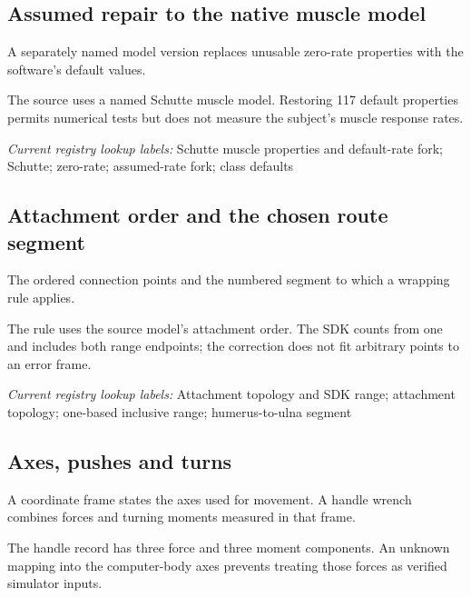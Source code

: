 \begin{samepage}
\subsection*{Assumed repair to the native muscle model}
\noindent A separately named model version replaces unusable zero-rate properties with the software’s default values.\par
\end{samepage}
\begin{samepage}
\noindent The source uses a named Schutte muscle model. Restoring 117 default properties permits numerical tests but does not measure the subject’s muscle response rates.\par\nopagebreak[4]

\end{samepage}


\noindent\textit{Current registry lookup labels:} Schutte muscle properties and default-rate fork; Schutte; zero-rate; assumed-rate fork; class defaults\par

\begin{samepage}
\subsection*{Attachment order and the chosen route segment}
\noindent The ordered connection points and the numbered segment to which a wrapping rule applies.\par
\end{samepage}
\begin{samepage}
\noindent The rule uses the source model’s attachment order. The SDK counts from one and includes both range endpoints; the correction does not fit arbitrary points to an error frame.\par\nopagebreak[4]

\end{samepage}


\noindent\textit{Current registry lookup labels:} Attachment topology and SDK range; attachment topology; one-based inclusive range; humerus-to-ulna segment\par

\begin{samepage}
\subsection*{Axes, pushes and turns}
\noindent A coordinate frame states the axes used for movement. A handle wrench combines forces and turning moments measured in that frame.\par
\end{samepage}
\begin{samepage}
\noindent The handle record has three force and three moment components. An unknown mapping into the computer-body axes prevents treating those forces as verified simulator inputs.\par\nopagebreak[4]

\end{samepage}


